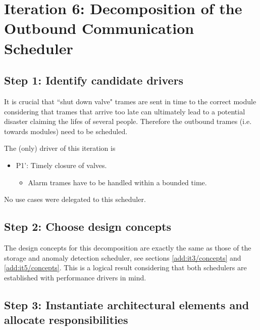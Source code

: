 \section{Iteration 6: Decomposition of the Outbound Communication Scheduler}
\label{add:it6}

\subsection{Step 1: Identify candidate drivers}
\label{add:it6/drivers}

\npar It is crucial that ``shut down valve" trames are sent in time to the
correct module considering that trames that arrive too late can ultimately
lead to a potential disaster claiming the lifes of several people. Therefore the
outbound trames (i.e. towards modules) need to be scheduled. 

\npar The (only) driver of this iteration is 

\begin{itemize}
  	\item P1': Timely closure of valves.
  	\begin{itemize}
  		\item Alarm trames have to be handled within a bounded time. 
    \end{itemize}
\end{itemize}

\npar No use cases were delegated to this scheduler.

\subsection{Step 2: Choose design concepts}
\label{add:it6/concepts}

\npar The design concepts for this decomposition are exactly the same as those
of the storage and anomaly detection scheduler, see sections
\ref{add:it3/concepts} and \ref{add:it5/concepts}.
This is a logical result considering that both schedulers are established with
performance drivers in mind.

\subsection{Step 3: Instantiate architectural elements and allocate responsibilities}
\label{add:it6/elements}

